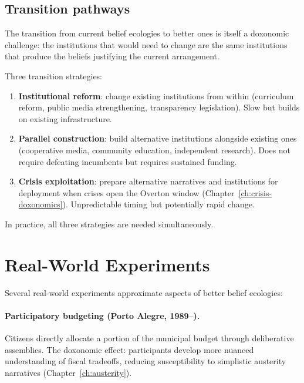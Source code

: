 \subsection{Transition pathways}

The transition from current belief ecologies to better ones is itself a doxonomic challenge: the institutions that would need to change are the same institutions that produce the beliefs justifying the current arrangement.

\begin{model}
\label{mod:transition}
Three transition strategies:
\begin{enumerate}[nosep]
  \item \textbf{Institutional reform}: change existing institutions from within (curriculum reform, public media strengthening, transparency legislation).
  Slow but builds on existing infrastructure.
  \item \textbf{Parallel construction}: build alternative institutions alongside existing ones (cooperative media, community education, independent research).
  Does not require defeating incumbents but requires sustained funding.
  \item \textbf{Crisis exploitation}: prepare alternative narratives and institutions for deployment when crises open the Overton window (Chapter~\ref{ch:crisis-doxonomics}).
  Unpredictable timing but potentially rapid change.
\end{enumerate}
In practice, all three strategies are needed simultaneously.
\end{model}

\section{Real-World Experiments}
\label{sec:ch33-experiments}

Several real-world experiments approximate aspects of better belief ecologies:

\paragraph{Participatory budgeting (Porto Alegre, 1989--).}
Citizens directly allocate a portion of the municipal budget through deliberative assemblies.
The doxonomic effect: participants develop more nuanced understanding of fiscal tradeoffs, reducing susceptibility to simplistic austerity narratives (Chapter~\ref{ch:austerity}).


